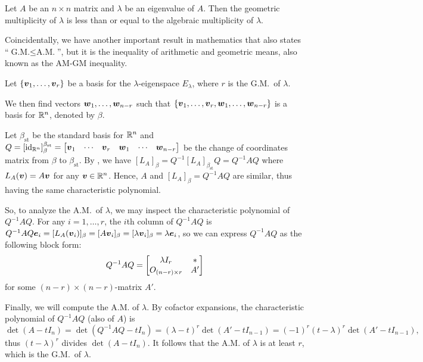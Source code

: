 \begin{enumerate}
\begin{theorem}
\label{thm:gm-leq-am}
Let \(A\) be an \(n\times n\) matrix and \(\lambda\) be an eigenvalue of \(A\).
Then the geometric multiplicity of \(\lambda\) is less than or equal to the
algebraic multiplicity of \(\lambda\).
\end{theorem}
\begin{note}
Coincidentally, we have another important result in mathematics that also
states ``\(\text{G.M.}\leq\text{A.M.}\)'', but it is the inequality of
arithmetic and geometric means, also known as the AM-GM inequality.
\end{note}

\begin{pf}
Let \(\{\vb*{v}_1,\dotsc,\vb*{v}_r\}\) be a basis for the
\(\lambda\)-eigenspace \(E_{\lambda}\), where \(r\) is the G.M.\ of \(\lambda\).

We then find vectors \(\vb*{w}_1,\dotsc,\vb*{w}_{n-r}\) such that
\(\{\vb*{v}_1,\dotsc,\vb*{v}_r,\vb*{w}_1,\dotsc,\vb*{w}_{n-r}\}\) is a
basis for \(\mathbb{R}^n\), denoted by \(\beta\).

Let \(\beta_{\mathrm{st}}\) be the standard basis for \(\mathbb{R}^n\) and
\(Q=[\id_{\R^n}]_{\beta}^{\beta_{\mathrm{st}}}=\mqty[\vect{v}_1&\cdots&\vect{v}_r&\vect{w}_1&\cdots&\vect{w}_{n-r}]\)
be the change of coordinates matrix from \(\beta\) to \(\beta_{\mathrm{st}}\).
By , we have \(
[L_A]_{\beta}=Q^{-1}[L_A]_{\beta_{\mathrm{st}}}Q=Q^{-1}AQ\) where
\(L_A(\vb*{v})=A\vb*{v}\) for any \(\vb*{v}\in\mathbb{R}^n\). Hence, \(A\) and
\([L_A]_{\beta}=Q^{-1}AQ\) are similar, thus having the same characteristic
polynomial.

So, to analyze the A.M.\ of \(\lambda\), we may inspect the characteristic
polynomial of \(Q^{-1}AQ\). For any \(i=1,\dotsc,r\), the \(i\)th column of
\(Q^{-1}AQ\) is
\(Q^{-1}AQ\vb*{e}_i=[L_A(\vb*{v}_i)]_{\beta}=[A\vb*{v}_i]_{\beta}=[\lambda
\vb*{v}_i]_{\beta}=\lambda\vb*{e}_i\), so we can express \(Q^{-1}AQ\) as the
following block form:
\[
Q^{-1}AQ=\mqty[\lambda I_r&*\\ O_{(n-r)\times r}&A']
\]
for some \((n-r)\times (n-r)\)-matrix \(A'\).

Finally, we will compute the A.M. of \(\lambda\). By cofactor expansions, the
characteristic polynomial of \(Q^{-1}AQ\) (also of \(A\)) is
\[
\det(A-tI_n)=\det(Q^{-1}AQ-tI_n)=(\lambda-t)^{r}\det(A'-tI_{n-1})
=(-1)^{r}(t-\lambda)^r\det(A'-tI_{n-1}),
\]
thus \((t-\lambda)^r\) divides \(\det(A-tI_n)\). It follows that the A.M. of
\(\lambda\) is at least \(r\), which is the G.M.\ of \(\lambda\).
\end{pf}


\end{enumerate}

